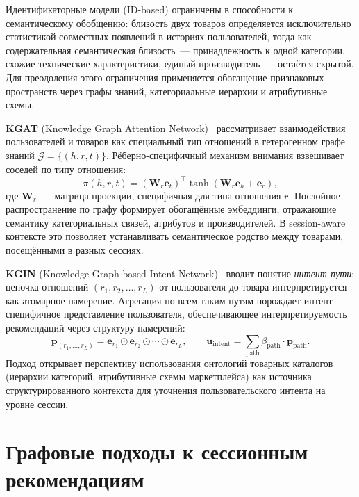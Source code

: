 Идентификаторные модели (ID-based) ограничены в способности к семантическому обобщению: близость двух товаров определяется исключительно статистикой совместных появлений в историях пользователей, тогда как содержательная семантическая близость~--- принадлежность к одной категории, схожие технические характеристики, единый производитель~--- остаётся скрытой. Для преодоления этого ограничения применяется обогащение признаковых пространств через графы знаний, категориальные иерархии и атрибутивные схемы.

\textbf{KGAT} (Knowledge Graph Attention Network)~\cite{wang2019kgat} рассматривает взаимодействия пользователей и товаров как специальный тип отношений в гетерогенном графе знаний $\mathcal{G} = \{(h, r, t)\}$. Рёберно-специфичный механизм внимания взвешивает соседей по типу отношения:
\begin{equation}
    \pi(h, r, t) = (\mathbf{W}_r \mathbf{e}_t)^\top \tanh(\mathbf{W}_r \mathbf{e}_h + \mathbf{e}_r),
\end{equation}
где $\mathbf{W}_r$~--- матрица проекции, специфичная для типа отношения $r$. Послойное распространение по графу формирует обогащённые эмбеддинги, отражающие семантику категориальных связей, атрибутов и производителей. В session-aware контексте это позволяет устанавливать семантическое родство между товарами, посещёнными в разных сессиях.

\textbf{KGIN} (Knowledge Graph-based Intent Network)~\cite{wang2021kgin} вводит понятие \textit{интент-пути}: цепочка отношений $(r_1, r_2, \ldots, r_L)$ от пользователя до товара интерпретируется как атомарное намерение. Агрегация по всем таким путям порождает интент-специфичное представление пользователя, обеспечивающее интерпретируемость рекомендаций через структуру намерений:
\begin{equation}
    \mathbf{p}_{(r_1,\ldots,r_L)} = \mathbf{e}_{r_1} \odot \mathbf{e}_{r_2} \odot \cdots \odot \mathbf{e}_{r_L},
    \qquad
    \mathbf{u}_\text{intent} = \sum_{\text{path}} \beta_{\text{path}} \cdot \mathbf{p}_{\text{path}}.
\end{equation}
Подход открывает перспективу использования онтологий товарных каталогов (иерархии категорий, атрибутивные схемы маркетплейса) как источника структурированного контекста для уточнения пользовательского интента на уровне сессии.

\section{Графовые подходы к сессионным рекомендациям}
\label{sec:ch1:graph}

